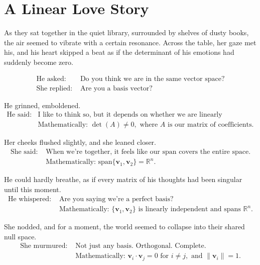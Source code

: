 \documentclass{article}
\begin{document}
\section*{A Linear Love Story}

As they sat together in the quiet library, surrounded by shelves of dusty books, the air seemed to vibrate with a certain resonance. Across the table, her gaze met his, and his heart skipped a beat as if the determinant of his emotions had suddenly become zero.

\begin{align*}
    \text{He asked: }    & \text{Do you think we are in the same vector space?} \\
    \text{She replied: } & \text{Are you a basis vector?}
\end{align*}

He grinned, emboldened.
\begin{align*}
    \text{He said: } & \text{I like to think so, but it depends on whether we are linearly independent.}               \\
                     & \text{Mathematically: } \det(A) \neq 0, \text{ where } A \text{ is our matrix of coefficients.}
\end{align*}

Her cheeks flushed slightly, and she leaned closer.
\begin{align*}
    \text{She said: } & \text{When we're together, it feels like our span covers the entire space.}       \\
                      & \text{Mathematically: } \text{span}\{\mathbf{v}_1, \mathbf{v}_2\} = \mathbb{R}^n.
\end{align*}

He could hardly breathe, as if every matrix of his thoughts had been singular until this moment.
\begin{align*}
    \text{He whispered: } & \text{Are you saying we're a perfect basis?}                                                                    \\
                          & \text{Mathematically: } \{\mathbf{v}_1, \mathbf{v}_2\} \text{ is linearly independent and spans } \mathbb{R}^n.
\end{align*}

She nodded, and for a moment, the world seemed to collapse into their shared null space.
\begin{align*}
    \text{She murmured: } & \text{Not just any basis. Orthogonal. Complete.}                                                                      \\
                          & \text{Mathematically: } \mathbf{v}_i \cdot \mathbf{v}_j = 0 \text{ for } i \neq j, \text{ and } \|\mathbf{v}_i\| = 1.
\end{align*}
\end{document}
